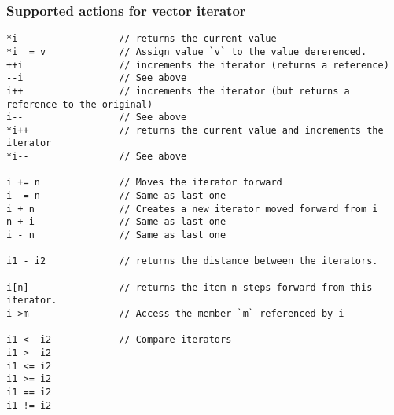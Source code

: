 \documentclass{report}
\begin{document}
\subsubsection{Supported actions for vector iterator}
\begin{verbatim}
*i                  // returns the current value
*i  = v             // Assign value `v` to the value dererenced.
++i                 // increments the iterator (returns a reference)
--i                 // See above
i++                 // increments the iterator (but returns a reference to the original)
i--                 // See above
*i++                // returns the current value and increments the iterator
*i--                // See above

i += n              // Moves the iterator forward
i -= n              // Same as last one
i + n               // Creates a new iterator moved forward from i
n + i               // Same as last one
i - n               // Same as last one

i1 - i2             // returns the distance between the iterators.

i[n]                // returns the item n steps forward from this iterator.
i->m                // Access the member `m` referenced by i

i1 <  i2            // Compare iterators
i1 >  i2
i1 <= i2
i1 >= i2
i1 == i2
i1 != i2
\end{verbatim}
\end{document}
